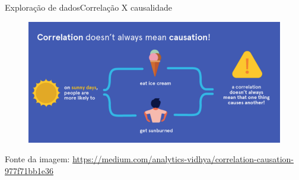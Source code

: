 \documentclass[t]{beamer}
\begin{document}

\begin{ftst}{Exploração de dados}{Correlação X causalidade}

\begin{figure}
    \centering
    \includegraphics[scale=0.4]{Figuras/slide01_10.png}
\end{figure}
\vone
\vone
\scriptsize
Fonte da imagem: \href{https://medium.com/analytics-vidhya/correlation-causation-977f71bb1e36}{https://medium.com/analytics-vidhya/correlation-causation-977f71bb1e36}

\end{ftst}

\end{document}
